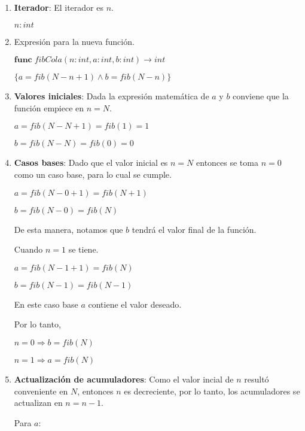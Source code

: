\documentclass[hidelinks]{article}
\begin{document}
\begin{enumerate}
	\item \textbf{Iterador}: El iterador es $n$.\par
	      $n: int$\par
	\item Expresión para la nueva función.\par
	      $\textbf{func} \; fibCola(n: int, a: int, b: int) \rightarrow int$ \par
	      $\{a = fib(N - n + 1) \land b = fib(N - n)\}$ \par
	\item \textbf{Valores iniciales}: Dada la expresión matemática de $a$ y $b$ conviene que la
	      función empiece en $n = N$.\par
	      $a = fib(N - N + 1) = fib(1) = 1$\par
	      $b = fib(N - N) = fib(0) = 0$\par
	\item \textbf{Casos bases}: Dado que el valor inicial es $n = N$ entonces se toma $n = 0$ como
	      un caso base, para lo cual se cumple.\par
	      $a = fib(N - 0 + 1) = fib(N + 1)$\par
	      $b = fib(N - 0) = fib(N)$\par
	      De esta manera, notamos que $b$ tendrá el valor final de la función.\par
	      Cuando $n = 1$ se tiene.\par
	      $a = fib(N - 1 + 1) = fib(N)$\par
	      $b = fib(N - 1) = fib(N - 1)$\par
	      En este caso base $a$ contiene el valor deseado.\par
	      Por lo tanto,
	      \begin{center}
		      $n = 0 \Rightarrow b = fib(N)$\par
		      $n = 1 \Rightarrow a = fib(N)$\par
	      \end{center}
	\item \textbf{Actualización de acumuladores}: Como el valor incial de $n$ resultó conveniente
	      en $N$, entonces $n$ es decreciente, por lo tanto, los acumuladores se
	      actualizan en $n = n - 1$.\par
	      Para $a$:\par


\end{enumerate}
\end{document}
